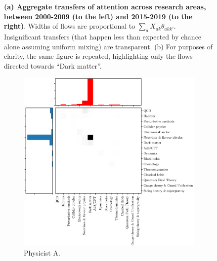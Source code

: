 \documentclass{article}
\begin{document}
\begin{figure}[h]
\begin{subfigure}{0.45\textwidth}
    \label{fig:sankey_b}
\end{subfigure}
     \caption{\textbf{(a) Aggregate transfers of attention across research areas, between 2000-2009 (to the left) and 2015-2019 (to the right)}. Widths of flows are proportional to $\sum_a X_{ak}\theta_{akk'}$. Insignificant transfers (that happen less than expected by chance alone assuming uniform mixing) are transparent. (b) For purposes of clarity, the same figure is repeated, highlighting only the flows directed towards ``Dark matter''.}
     \label{fig:sankey}
 \end{figure}


\begin{figure}[h]
\begin{subfigure}{.45\textwidth}
    \includegraphics[width=1.15\textwidth]{Fig4a.eps}
    \caption{Physicist A. %
    }
    \label{fig:S.Ando.1}
\end{subfigure}\hfill%
\begin{subfigure}{0.45\textwidth}

\end{subfigure}
\end{figure}
\end{document}
